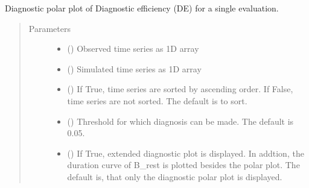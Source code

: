 \documentclass[letterpaper,10pt,english]{sphinxmanual}
\begin{document}
\begin{fulllineitems}
\label{\detokenize{reference/de:de.de.diag_polar_plot}}
Diagnostic polar plot of Diagnostic efficiency (DE) for a single
evaluation.
\begin{quote}\begin{description}
\item[{Parameters}] \leavevmode\begin{itemize}
\item {} 
 (\sphinxstyleliteralemphasis{\sphinxupquote{(}}\sphinxstyleliteralemphasis{\sphinxupquote{,}}\sphinxstyleliteralemphasis{\sphinxupquote{)}}) \textendash{} Observed time series as 1\sphinxhyphen{}D array

\item {} 
 (\sphinxstyleliteralemphasis{\sphinxupquote{(}}\sphinxstyleliteralemphasis{\sphinxupquote{,}}\sphinxstyleliteralemphasis{\sphinxupquote{)}}) \textendash{} Simulated time series as 1\sphinxhyphen{}D array

\item {} 
 (\sphinxstyleliteralemphasis{\sphinxupquote{, }}) \textendash{} If True, time series are sorted by ascending order. If False, time
series are not sorted. The default is to sort.

\item {} 
 (\sphinxstyleliteralemphasis{\sphinxupquote{, }}) \textendash{} Threshold for which diagnosis can be made. The default is 0.05.

\item {} 
 (\sphinxstyleliteralemphasis{\sphinxupquote{, }}) \textendash{} If True, extended diagnostic plot is displayed. In addtion, the
duration curve of B\_rest is plotted besides the polar plot. The default
is, that only the diagnostic polar plot is displayed.


\end{itemize}
\end{description}
\end{quote}
\end{fulllineitems}
\end{document}
